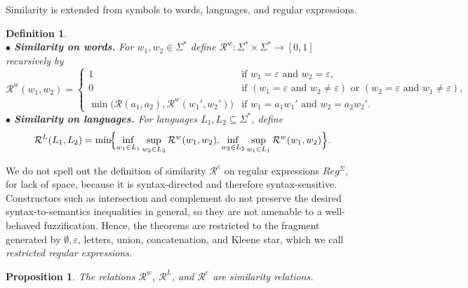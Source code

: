 \documentclass{easychair}
\newtheorem{definition}{Definition}
\newtheorem{proposition}{Proposition}
\begin{document}
Similarity is extended from symbols to words, languages, and regular expressions. 
\begin{definition}\hfill\\
$\bullet$ {\bf Similarity on words.}
For $w_1,w_2\in\Sigma^\ast$ define $
\mathcal R^w:\Sigma^\ast\times\Sigma^\ast\to[0,1]$
recursively by\\ $
\mathcal R^w(w_1,w_2)=
\begin{cases}
1 & \text{if } w_1=\varepsilon \text{ and } w_2=\varepsilon,\\[2pt]
0 & \text{if } (w_1=\varepsilon \text{ and } w_2\neq\varepsilon)
\text{ or } (w_2=\varepsilon \text{ and } w_1\neq\varepsilon),\\[4pt]
\min\!\bigl(\mathcal R(a_1,a_2),\mathcal R^w(w_1',w_2')\bigr)
& \text{if } w_1=a_1w_1' \text{ and } w_2=a_2w_2'.

\end{cases}$\smallskip\\
$\bullet$ {\bf Similarity on languages.}
For languages $L_1,L_2\subseteq\Sigma^\ast$, define
\[
\mathcal R^L(L_1,L_2)
=
\min\!\Bigl\{
\inf_{w_1\in L_1}\sup_{w_2\in L_2}\mathcal R^w(w_1,w_2),
\inf_{w_2\in L_2}\sup_{w_1\in L_1}\mathcal R^w(w_1,w_2)
\Bigr\}.
\]\end{definition} We do not spell out the definition of similarity $\mathcal R^e$ on regular
expressions {$Reg^\Sigma$}, for lack of space, because it is syntax-directed and therefore
syntax-sensitive. Constructors such as intersection and complement do not preserve the
desired syntax-to-semantics inequalities in general, so they are not amenable to a well-behaved fuzzification. Hence, the theorems are restricted to the fragment generated by $\emptyset,\varepsilon$,
letters, union, concatenation, and Kleene star, which we call {\em restricted regular expressions}. 

\begin{proposition} The relations $\mathcal R^w$, $\mathcal R^L$, and $\mathcal R^e$ are similarity relations. 
\end{proposition}
\end{document}
